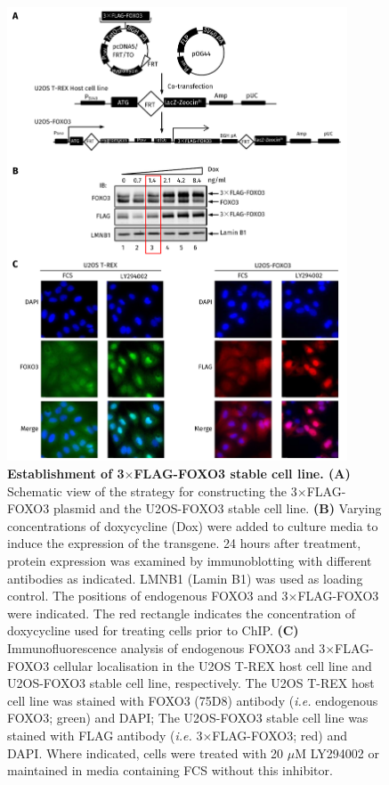 \begin{figure}[!h]
    \centering
    \includegraphics[width=0.9\textwidth]{chapter3/figures_overview/fig11.pdf}
    \caption[Establishment of 3$\times$FLAG-FOXO3 stable cell line]{\textbf{Establishment of 3$\times$FLAG-FOXO3 stable cell line. (A)} Schematic view of the strategy for constructing the 3$\times$FLAG-FOXO3 plasmid and the U2OS-FOXO3 stable cell line. \textbf{(B)} Varying concentrations of doxycycline (Dox) were added to culture media to induce the expression of the transgene. 24 hours after treatment, protein expression was examined by immunoblotting with different antibodies as indicated. LMNB1 (Lamin B1) was used as loading control. The positions of endogenous FOXO3 and 3$\times$FLAG-FOXO3 were indicated. The red rectangle indicates the concentration of doxycycline used for treating cells prior to ChIP. \textbf{(C)} Immunofluorescence analysis of endogenous FOXO3 and 3$\times$FLAG-FOXO3 cellular localisation in the U2OS T-REX host cell line and U2OS-FOXO3 stable cell line, respectively. The U2OS T-REX host cell line was stained with FOXO3 (75D8) antibody (\textit{i.e.} endogenous FOXO3; green) and DAPI; The U2OS-FOXO3 stable cell line was stained with FLAG antibody (\textit{i.e.} 3$\times$FLAG-FOXO3; red) and DAPI. Where indicated, cells were treated with 20 $\mu$M LY294002 or maintained in media containing FCS without this inhibitor.}
    \label{fig:fig11}
\end{figure}

